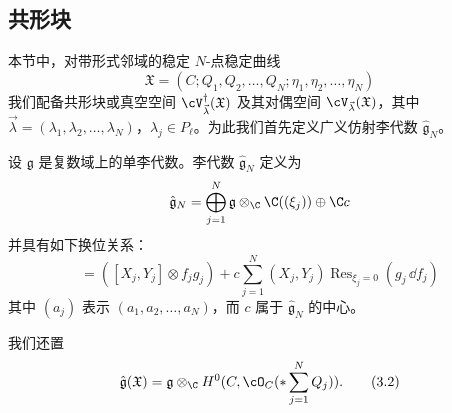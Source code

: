 \subsection{共形块}
本节中，对带形式邻域的稳定 $N$-点稳定曲线
\[
\mathfrak{X}=(C;Q_1,Q_2,\dots,Q_N;\eta_1,\eta_2,\dots,\eta_N)
\]
我们配备共形块或真空空间 $\cV^{\dagger}_{\vec{\lambda}}(\mathfrak{X})$ 及其对偶空间 $\cV_{\vec{\lambda}}(\mathfrak{X})$，其中 $\vec{\lambda}=(\lambda_1,\lambda_2,\dots,\lambda_N)$，$\lambda_j\in P_\ell$。为此我们首先定义广义仿射李代数 $\hat{\mathfrak{g}}_N$。


\begin{definition}[3.1]
设 $\mathfrak{g}$ 是复数域上的单李代数。李代数 $\hat{\mathfrak{g}}_N$ 定义为
\[
\hat{\mathfrak{g}}_N=\bigoplus_{j=1}^{N}\mathfrak{g}\otimes_{\C}\C((\xi_j))\oplus\C c
\]
并具有如下换位关系：
\begin{equation}
[(X_j\otimes f_j),(Y_j\otimes g_j)]=([X_j,Y_j]\otimes f_j g_j)+c\sum_{j=1}^{N}(X_j,Y_j)\operatorname{Res}_{\xi_j=0}(g_j\,\dd f_j) \tag{3.1}
\end{equation}
其中 $(a_j)$ 表示 $(a_1,a_2,\dots,a_N)$，而 $c$ 属于 $\hat{\mathfrak{g}}_N$ 的中心。
\end{definition}




我们还置
\begin{equation}
\hat{\mathfrak{g}}(\mathfrak{X})=\mathfrak{g}\otimes_{\C}H^0(C,\cO_C(*\sum_{j=1}^{N}Q_j)). \tag{3.2}
\end{equation}


